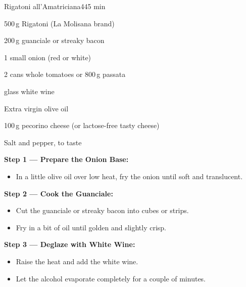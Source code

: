 \begin{recipebox}{Rigatoni all’Amatriciana}{4}{45 min}

  \begin{ingredients}
    \item 500\,g Rigatoni (La Molisana brand)
    \item 200\,g guanciale or streaky bacon
    \item 1 small onion (red or white)
    \item 2 cans whole tomatoes or 800\,g passata
    \item {} glass white wine
    \item Extra virgin olive oil
    \item 100\,g pecorino cheese (or lactose-free tasty cheese)
    \item Salt and pepper, to taste
  \end{ingredients}

  \vspace{-0.5em}
  \begin{method}

    \item \textbf{Step 1 — Prepare the Onion Base:}
    \begin{itemize}[leftmargin=2em]
      \item In a little olive oil over low heat, fry the onion until soft and translucent.
    \end{itemize}

    \vspace{0.5em}

    \item \textbf{Step 2 — Cook the Guanciale:}
    \begin{itemize}[leftmargin=2em]
      \item Cut the guanciale or streaky bacon into cubes or strips.
      \item Fry in a bit of oil until golden and slightly crisp.
    \end{itemize}

    \vspace{0.5em}

    \item \textbf{Step 3 — Deglaze with White Wine:}
    \begin{itemize}[leftmargin=2em]
      \item Raise the heat and add the white wine.
      \item Let the alcohol evaporate completely for a couple of minutes.
    \end{itemize}


\end{method}
\end{recipebox}
